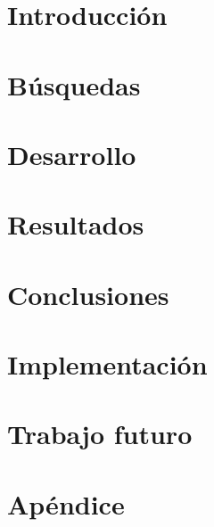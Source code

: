 \documentclass[11pt,a4paper]{tesis}
\begin{document}
\def\titulo{Licenciado }
\def\autor{Amit Stein, Juan Andrés Knebel}
\def\tituloTesis{Composite Retrival: \mbox{Algo}}
\def\runtitulo{Composite Retrival en español}
\def\runtitle{Composite Retrival en ingles}
\def\director{Obi-Wan Kenobi}
\def\codirector{Master Yoda}
\def\lugar{Buenos Aires, 2014}
%

\frontmatter
\pagestyle{empty}
%

%



\cleardoublepage
\tableofcontents

\mainmatter
\pagestyle{headings}


\chapter{Introducción}

\chapter{Búsquedas}

\chapter{Desarrollo}

\chapter{Resultados}

\chapter{Conclusiones}

\chapter{Implementación}

\chapter{Trabajo futuro}

\chapter{Apéndice}



%

%
\end{document}

